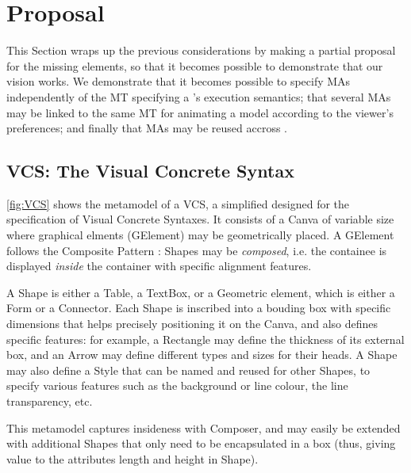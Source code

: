 \section{Proposal}
\label{sec:Proposal}

This Section wraps up the previous considerations by making a partial proposal
for the missing elements, so that it becomes possible to demonstrate that our vision
works. We demonstrate that it becomes possible to specify MAs independently of the
MT specifying a \DSL's execution semantics; that several MAs may be linked to
the same MT for animating a model according to the viewer's preferences; and finally
that MAs may be reused accross \DSLs.


\subsection{\textsf{VCS}: The Visual Concrete Syntax \DSL}
\label{sec:Proposal-VCS}

\autoref{fig:VCS} shows the metamodel of a \textsf{VCS}, a simplified \DSL designed
for the specification of Visual Concrete Syntaxes. It consists of a \textsf{Canva}
of variable size where graphical elments (\textsf{GElement}) may be geometrically
placed. A \textsf{GElement} follows the Composite Pattern \citep{B:Gamma-etAl:1995}:
\textsf{Shape}s may be \emph{composed}, i.e. the \textsf{containee} is displayed
\emph{inside} the \textsf{container} with specific alignment features. 

A \textsf{Shape} is either a \textsf{Table}, a \textsf{TextBox}, or a 
\textsf{Geometric} element, which is either a \textsf{Form} or a 
\textsf{Connector}. Each \textsf{Shape} is inscribed into a bouding box with specific 
dimensions that helps precisely positioning it on the \textsf{Canva}, and also
defines specific features: for example, a Rectangle may define the thickness of its
external box, and an Arrow may define different types and sizes for their heads.
A \textsf{Shape} may also define a \textsf{Style} that can be \textsf{name}d and
reused for other \textsf{Shape}s, to specify various features such as the background
or line colour, the line transparency, etc.

This metamodel captures insideness with \textsf{Composer}, and may easily be extended
with additional \textsf{Shape}s that only need to be encapsulated in a box (thus,
giving value to the attributes \textsf{length} and \textsf{height} in \textsf{Shape}).



